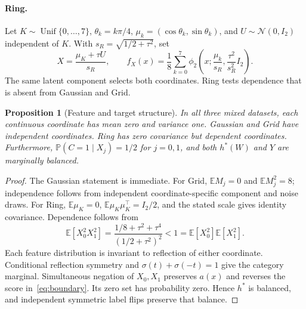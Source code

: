 \documentclass[11pt,letterpaper]{article}
\newcommand{\E}{\mathbb{E}}
\newcommand{\Prb}{\mathbb{P}}
\newcommand{\Normal}{\mathcal{N}}
\newtheorem{proposition}{Proposition}
\begin{document}
\paragraph{Ring.} Let $K\sim\operatorname{Unif}\{0,\ldots,7\}$, $\theta_k=k\pi/4$, $\mu_k=(\cos\theta_k,\sin\theta_k)$, and $U\sim\Normal(0,I_2)$ independent of $K$. With $s_R=\sqrt{1/2+\tau^2}$, set
\begin{equation}
 X=\frac{\mu_K+\tau U}{s_R},\qquad
 f_X(x)=\frac18\sum_{k=0}^{7}
 \phi_2\left(x;\frac{\mu_k}{s_R},\frac{\tau^2}{s_R^2}I_2\right).
 \label{eq:ring}
\end{equation}
The same latent component selects both coordinates. Ring tests dependence that is absent from Gaussian and Grid.

\begin{proposition}[Feature and target structure]
In all three mixed datasets, each continuous coordinate has mean zero and variance one. Gaussian and Grid have independent coordinates. Ring has zero covariance but dependent coordinates. Furthermore, $\Prb(C=1\mid X_j)=1/2$ for $j=0,1$, and both $h^*(W)$ and $Y$ are marginally balanced.
\end{proposition}
\begin{proof}
The Gaussian statement is immediate. For Grid, $\E M_j=0$ and $\E M_j^2=8$; independence follows from independent coordinate-specific component and noise draws. For Ring, $\E\mu_K=0$, $\E\mu_K\mu_K^\top=I_2/2$, and the stated scale gives identity covariance. Dependence follows from
\[
 \E[X_0^2X_1^2]=\frac{1/8+\tau^2+\tau^4}{(1/2+\tau^2)^2}<1
 =\E[X_0^2]\E[X_1^2].
\]
Each feature distribution is invariant to reflection of either coordinate. Conditional reflection symmetry and $\sigma(t)+\sigma(-t)=1$ give the category marginal. Simultaneous negation of $X_0,X_1$ preserves $a(x)$ and reverses the score in~\eqref{eq:boundary}. Its zero set has probability zero. Hence $h^*$ is balanced, and independent symmetric label flips preserve that balance.
\end{proof}
\end{document}
